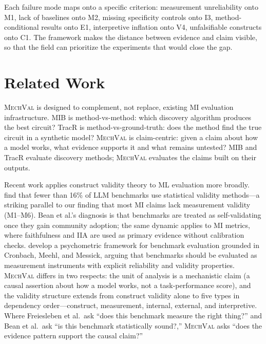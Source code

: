 \documentclass{article}
\newcommand{\mechval}{\textsc{MechVal}}
\begin{document}
Each failure mode maps onto a specific criterion: measurement unreliability onto M1, lack of baselines onto M2, missing specificity controls onto I3, method-conditional results onto E1, interpretive inflation onto V4, unfalsifiable constructs onto C1. The framework makes the distance between evidence and claim visible, so that the field can prioritize the experiments that would close the gap.


\section{Related Work}
\label{sec:related}

\mechval{} is designed to complement, not replace, existing MI evaluation infrastructure. MIB \citep{mueller2025mib} is method-vs-method: which discovery algorithm produces the best circuit? TracR \citep{lindner2024interp} is method-vs-ground-truth: does the method find the true circuit in a synthetic model? \mechval{} is claim-centric: given a claim about how a model works, what evidence supports it and what remains untested? MIB and TracR evaluate discovery methods; \mechval{} evaluates the claims built on their outputs.

Recent work applies construct validity theory to ML evaluation more broadly. \citet{bean2025measuring} find that fewer than 16\% of LLM benchmarks use statistical validity methods---a striking parallel to our finding that most MI claims lack measurement validity (M1--M6). Bean et al.'s diagnosis is that benchmarks are treated as self-validating once they gain community adoption; the same dynamic applies to MI metrics, where faithfulness and IIA are used as primary evidence without calibration checks. \citet{freiesleben2025benchmarking} develop a psychometric framework for benchmark evaluation grounded in Cronbach, Meehl, and Messick, arguing that benchmarks should be evaluated as measurement instruments with explicit reliability and validity properties. \mechval{} differs in two respects: the unit of analysis is a mechanistic claim (a causal assertion about how a model works, not a task-performance score), and the validity structure extends from construct validity alone to five types in dependency order---construct, measurement, internal, external, and interpretive. Where Freiesleben et al.\ ask ``does this benchmark measure the right thing?'' and Bean et al.\ ask ``is this benchmark statistically sound?,'' \mechval{} asks ``does the evidence pattern support the causal claim?''
\end{document}
